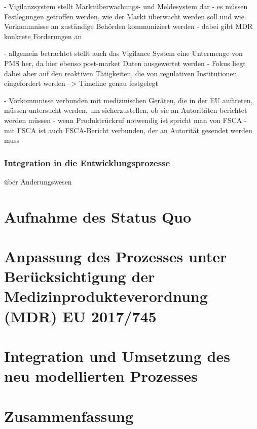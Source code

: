 \documentclass[a4paper,12pt]{report}
\begin{document}
- Vigilanzsystem stellt Marktüberwachungs- und Meldesystem dar
- es müssen Festlegungen getroffen werden, wie der Markt überwacht werden soll und wie Vorkommnisse an zuständige Behörden kommuniziert werden
- dabei gibt MDR konkrete Forderungen an\citep[vgl.][]{Johner2017}

- allgemein betrachtet stellt auch das Vigilance System eine Untermenge von PMS her, da hier ebenso post-market Daten ausgewertet werden
- Fokus liegt dabei aber auf den reaktiven Tätigkeiten, die von regulativen Institutionen eingefordert werden --> Timeline genau festgelegt \citep[vgl.][S. 1]{Pugh2017}

- Vorkommnisse verbunden mit medizinischen Geräten, die in der EU auftreten, müssen untersucht werden, um sicherzustellen, ob sie an Autoritäten berichtet werden müssen
- wenn Produktrückruf notwendig ist spricht man von \ac{FSCA}
- mit FSCA ist auch FSCA-Bericht verbunden, der an Autorität gesendet werden muss\citep[vgl.][S. 1f.]{Loh2017}
\subsection{Integration in die Entwicklungsprozesse}\label{subsec:IntegrationInDevProzesse}
über Änderungswesen

\chapter{Aufnahme des Status Quo}\label{chap:AufnahmeStatusQuo}

\chapter{Anpassung des Prozesses unter Berücksichtigung der Medizinprodukteverordnung (MDR) EU 2017/745}\label{chap:AnpassungAnMDR}

\chapter{Integration und Umsetzung des neu modellierten Prozesses}\label{chap:Integration}

\chapter{Zusammenfassung}\label{chap:Zusammenfassung}
\end{document}
